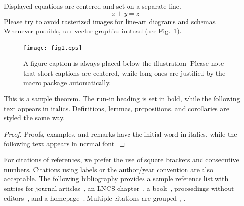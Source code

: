 \documentclass[runningheads]{llncs}
\begin{document}
{    \noindent Displayed equations are centered and set on a separate
    line.
    \begin{equation}
        x + y = z
    \end{equation}
    Please try to avoid rasterized images for line-art diagrams and
    schemas. Whenever possible, use vector graphics instead (see
    Fig.~\ref{fig1}).

    \begin{figure}
        \texttt{[image: fig1.eps]}
        \caption{A figure caption is always placed below the illustration.
        Please note that short captions are centered, while long ones are
        justified by the macro package automatically.} \label{fig1}
    \end{figure}

    \begin{theorem}
        This is a sample theorem. The run-in heading is set in bold, while
        the following text appears in italics. Definitions, lemmas,
        propositions, and corollaries are styled the same way.
    \end{theorem}
    \begin{proof}
        Proofs, examples, and remarks have the initial word in italics,
        while the following text appears in normal font.
    \end{proof}
    For citations of references, we prefer the use of square brackets
    and consecutive numbers. Citations using labels or the author/year
    convention are also acceptable. The following bibliography provides
    a sample reference list with entries for journal
    articles~\cite{ref_article1}, an LNCS chapter~\cite{ref_lncs1}, a
    book~\cite{ref_book1}, proceedings without editors~\cite{ref_proc1},
    and a homepage~\cite{ref_url1}. Multiple citations are grouped
    \cite{ref_article1,ref_lncs1,ref_book1},
    \cite{ref_article1,ref_book1,ref_proc1,ref_url1}.
    }
    
    
\end{document}
